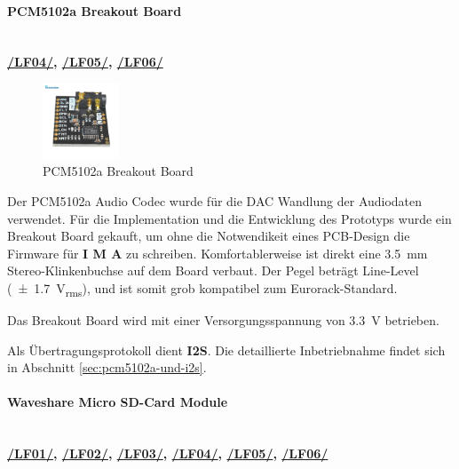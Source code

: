 \newpage



\paragraph{PCM5102a Breakout Board}\mbox{}\\

\textbf{\hyperlink{lf-audiorecord}{/LF04/}, \hyperlink{lf-audioplayback}{/LF05/}, \hyperlink{lf-pitchaudio}{/LF06/}} \\

\begin{figure} %
	\vspace{-20pt}
	\includegraphics[width=0.2\textwidth]{images/05_technische_spezifikation/audio/pcm5102a_breakout.jpg}
	\caption{PCM5102a Breakout Board}
	\label{fig:pcm5102a_breakout}
\end{figure}


Der PCM5102a Audio Codec wurde für die DAC Wandlung der Audiodaten verwendet. Für die Implementation und die Entwicklung des Prototyps wurde ein Breakout Board gekauft, um ohne die Notwendikeit eines PCB-Design die Firmware für \textbf{I M A} zu schreiben. 
Komfortablerweise ist direkt eine \SI{3,5}{\milli\meter} Stereo-Klinkenbuchse auf dem Board verbaut.
Der Pegel beträgt Line-Level (\SI{\pm 1.7}{\volt_{rms}}), und ist somit grob kompatibel zum Eurorack-Standard.

Das Breakout Board wird mit einer Versorgungsspannung von \SI{3,3}{\volt} betrieben.

Als Übertragungsprotokoll dient \textbf{I2S}. Die detaillierte Inbetriebnahme findet sich in Abschnitt \ref{sec:pcm5102a-und-i2s}.

\vspace{4em}

\paragraph{Waveshare Micro SD-Card Module}\mbox{}\\

\textbf{{\hyperlink{LF01_Link}{/LF01/}, \hyperlink{LF02_Link}{/LF02/}, \hyperlink{lf-nn-01}{/LF03/}, \hyperlink{lf-audiorecord}{/LF04/}, \hyperlink{lf-audioplayback}{/LF05/}, \hyperlink{lf-pitchaudio}{/LF06/}}} \\

